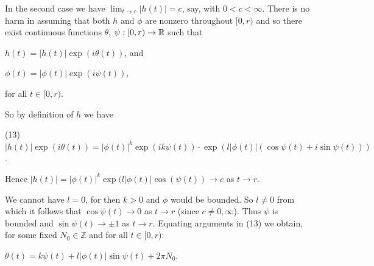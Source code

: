 \documentclass[12pt,nodate]{article}
\begin{document}
\vspace{2mm}

In the second case we have $\lim_{t \rightarrow r} |h(t)| = c$, say, with $0 < c < \infty$.
There is no harm in assuming that both $h$ and $\phi$ are nonzero throughout $[0, r)$ and so there exist continuous functions $\theta$, $\psi : [0, r) \rightarrow \mathbb{R}$ such that

\vspace{2mm}

\hspace{25mm} $h(t) = |h(t)|\exp (i\theta (t))$, and

\vspace{1mm}

\hspace{25mm} $\phi (t) = |\phi (t)|\exp(i\psi (t))$,

\vspace{1mm}

\noindent
for all $t \in [0, r)$.

\vspace{2mm}

So by definition of $h$ we have 

\vspace{2mm}

\noindent
(13) \hspace{3mm} $|h(t)|\exp(i\theta(t)) = |\phi (t)|^k \exp (ik\psi (t)) \cdot \exp (l|\phi (t)|(\cos \psi (t) + i\sin \psi (t)))$. 

\vspace{2mm}

Hence $|h(t)| = |\phi (t)|^k \exp (l|\phi (t)|\cos( \psi (t)) \rightarrow c$ as $t \rightarrow r$.

\vspace{1mm}

We cannot have $l = 0$, for then $k > 0$ and $\phi$ would be bounded. So $l \neq 0$ from which it follows that $\cos \psi (t) \rightarrow 0$ as $t \rightarrow r$ (since $c \neq 0, \infty$). Thus $\psi$ is bounded and $\sin \psi (t) \rightarrow \pm 1$ as $t \rightarrow r$. Equating arguments in (13) we obtain, for some fixed $N_0 \in \mathbb{Z}$ and for all $t \in [0, r)$:

\vspace{3mm}

\hspace{15mm} $\theta (t) = k\psi (t) + l|\phi (t)|\sin \psi (t) + 2\pi N_0$.

\vspace{3mm}
\end{document}
